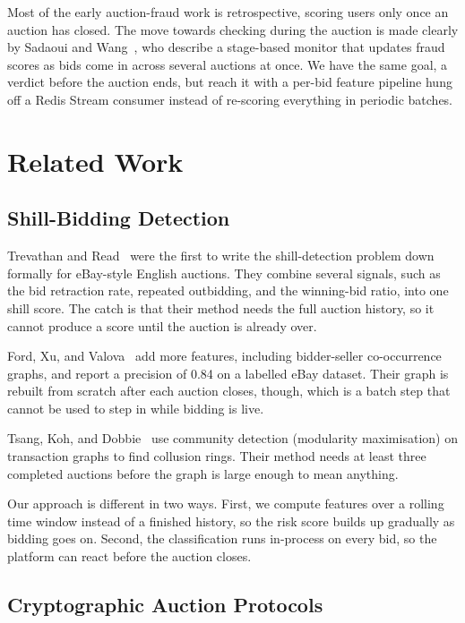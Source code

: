 \documentclass[conference]{IEEEtran}
\begin{document}
Most of the early auction-fraud work is retrospective, scoring users only
once an auction has closed. The move towards checking during the auction
is made clearly by Sadaoui and Wang~\cite{Sadaoui2017}, who describe a
stage-based monitor that updates fraud scores as bids come in across
several auctions at once. We have the same goal, a verdict before the
auction ends, but reach it with a per-bid feature pipeline hung off a
Redis Stream consumer instead of re-scoring everything in periodic
batches.

\section{Related Work}

\subsection{Shill-Bidding Detection}

Trevathan and Read~\cite{Trevathan2007} were the first to write the
shill-detection problem down formally for eBay-style English auctions.
They combine several signals, such as the bid retraction rate, repeated
outbidding, and the winning-bid ratio, into one shill score. The catch is
that their method needs the full auction history, so it cannot produce a
score until the auction is already over.

Ford, Xu, and Valova~\cite{Ford2010} add more features, including
bidder-seller co-occurrence graphs, and report a precision of 0.84 on a
labelled eBay dataset. Their graph is rebuilt from scratch after each
auction closes, though, which is a batch step that cannot be used to step
in while bidding is live.

Tsang, Koh, and Dobbie~\cite{Tsang2014} use community detection
(modularity maximisation) on transaction graphs to find collusion rings.
Their method needs at least three completed auctions before the graph is
large enough to mean anything.

Our approach is different in two ways. First, we compute features over a
rolling time window instead of a finished history, so the risk score
builds up gradually as bidding goes on. Second, the classification runs
in-process on every bid, so the platform can react before the auction
closes.

\subsection{Cryptographic Auction Protocols}
\end{document}
